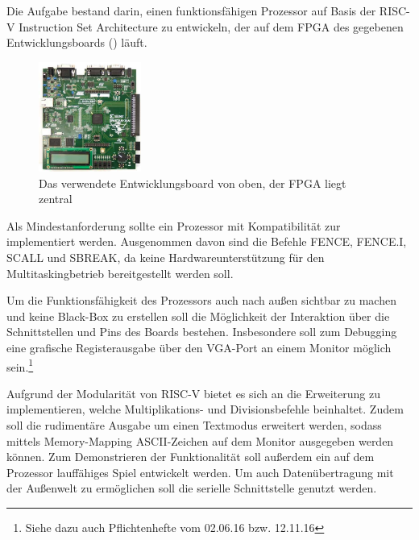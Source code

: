 

Die Aufgabe bestand darin, einen funktionsf\"ahigen Prozessor auf Basis der RISC-V Instruction Set Architecture zu entwickeln, der auf dem FPGA des gegebenen Entwicklungsboards () l\"auft.
\begin{figure}[H]
	\centering
		\includegraphics[width=0.3\textwidth]{Board.png}
	\caption[Entwicklungsboard]{Das verwendete Entwicklungsboard von oben, der FPGA liegt zentral}
	\label{fig:board}
\end{figure}


Als Mindestanforderung sollte ein Prozessor mit Kompatibilit\"at zur  implementiert werden. Ausgenommen davon sind die Befehle FENCE, FENCE.I, SCALL und SBREAK, da keine Hardwareunterst\"utzung f\"ur den Multitaskingbetrieb bereitgestellt werden soll.

Um die Funktionsf\"ahigkeit des Prozessors auch nach au{\ss}en sichtbar zu machen und keine Black-Box zu erstellen soll die M\"oglichkeit der Interaktion \"uber die Schnittstellen und Pins des Boards bestehen. Insbesondere soll zum Debugging eine grafische Registerausgabe \"uber den VGA-Port an einem Monitor m\"oglich sein.\footnote{Siehe dazu auch Pflichtenhefte vom 02.06.16 bzw. 12.11.16}


Aufgrund der Modularit\"at von RISC-V bietet es sich an die Erweiterung  zu implementieren, welche Multiplikations- und Divisionsbefehle beinhaltet. Zudem soll die rudiment\"are Ausgabe um einen Textmodus erweitert werden, sodass mittels Memory-Mapping ASCII-Zeichen auf dem Monitor ausgegeben werden k\"onnen. Zum Demonstrieren der Funktionalit\"at soll au{\ss}erdem ein auf dem Prozessor lauff\"ahiges Spiel entwickelt werden. Um auch Daten\"ubertragung mit der Au{\ss}enwelt zu erm\"oglichen soll die serielle Schnittstelle genutzt werden.

